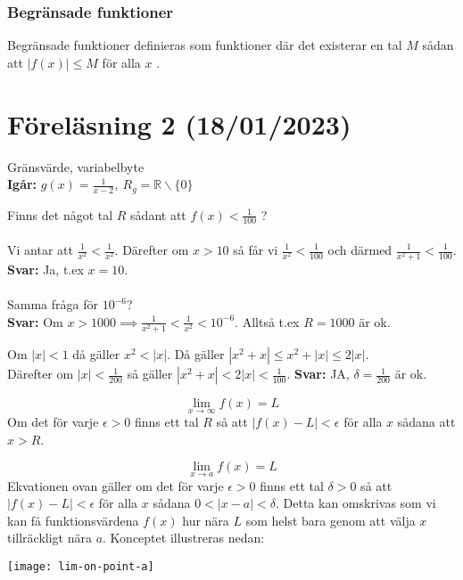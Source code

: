 \documentclass{report}
\begin{document}
\subsubsection{Begränsade funktioner}

{
Begränsade funktioner definieras som funktioner där det existerar en tal $ M $ sådan att $ |f(x)| \le M $ för alla $ x $ . 
}

\pagebreak
\section{Föreläsning 2 (18/01/2023)}
Gränsvärde, variabelbyte\\

\textbf{Igår:} $ g(x) = \frac{1}{x-2},\:R_g = \mathbb{R} \backslash \{0\} $

{
Finns det något tal $ R $ sådant att $ f(x) < \frac{1}{100}   $ ?\\\\

Vi antar att $ \frac{1}{x^2} < \frac{1}{x^2}  $. Därefter om $ x > 10 $ så får vi $ \frac{1}{x^2}  < \frac{1}{100}  $ och därmed $ \frac{1}{x^2+1} < \frac{1}{100}  $. \textbf{Svar:} Ja, t.ex $ x=10 $.\\\\

Samma fråga för $ 10^{-6} $?\\
\textbf{Svar:} Om $ x > 1000 \implies \frac{1}{x^2+1} < \frac{1}{x^2} < 10^{-6} $. Alltså t.ex $ R=1000 $ är ok.
}

{
		Om $ |x| < 1 $ då gäller $ x^2 < |x| $. Då gäller $ |x^2+x| \le x^2 + |x| \le  2 |x| $.\\
	Därefter om $ |x| < \frac{1}{200}  $ så gäller $ |x^2+x| < 2|x| < \frac{1}{100}  $. \textbf{Svar:} JA, $ \delta = \frac{1}{200}  $ är ok. 
}

\vspace{20pt}
{
\begin{equation*}
\lim_{x\to \infty} f(x) = L 
\end{equation*}
Om det för varje $ \epsilon > 0 $ finns ett tal $ R $ så att $ |f(x)-L| < \epsilon $ för alla $ x $ sådana att $ x > R $.  
}

{
\begin{equation*}
\lim_{x\to a} f(x) = L 
\end{equation*}
Ekvationen ovan gäller om det för varje $ \epsilon>0 $ finns ett tal $ \delta>0 $ så att $ |f(x)-L| < \epsilon $ för alla $ x $ sådana $ 0 < |x-a| < \delta $. Detta kan omskrivas som vi kan få funktionsvärdena $ f(x) $ hur nära $ L $ som helst bara genom att välja $ x $ tillräckligt nära $ a $. Konceptet illustreras nedan:
\vspace{20pt}
\begin{center}
\texttt{[image: lim-on-point-a]}
\end{center}
}
\end{document}
